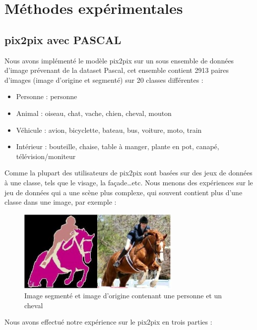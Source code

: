 \chapter{Méthodes expérimentales}

\section{pix2pix avec PASCAL}

Nous avons implémenté le modèle pix2pix sur un sous ensemble de données d'image prévenant de la dataset Pascal, cet ensemble contient 2913 paires d'images (image d'origine et segmenté) sur 20 classes différentes :
\begin{itemize}
	\item Personne : personne 
	\item Animal : oiseau, chat, vache, chien, cheval, mouton
	\item Véhicule : avion, bicyclette, bateau, bus, voiture, moto, train
	\item Intérieur : bouteille, chaise, table à manger, plante en pot, canapé, télévision/moniteur
\end{itemize}

Comme la plupart des utilisateurs de pix2pix sont basées sur des jeux de données à une classe, tels que le visage, la façade…etc. Nous menons des expériences sur le jeu de données qui a une scène plus complexe, qui souvent contient plus d'une classe dans une image, par exemple :


\begin{figure}[H] 
	\centering 
	\includegraphics[width=0.7\textwidth]{./resources/img/im_pascal.jpg} %
	\caption{Image segmenté et image d'origine contenant une personne et un cheval} %
	\label{Fig4_1} %
\end{figure}


\newpage
 Nous avons effectué notre expérience sur le pix2pix en trois parties :
 
